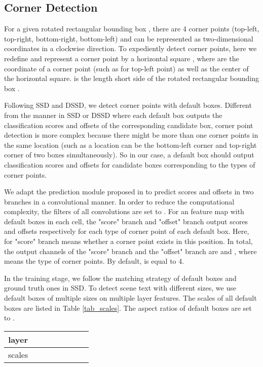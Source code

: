 \documentclass[10pt,twocolumn,letterpaper]{article}
\begin{document}
\subsection{Corner Detection}

For a given rotated rectangular bounding box , there are 4 corner points (top-left, top-right, bottom-right, bottom-left) and can be represented as two-dimensional coordinates  in a clockwise direction. To expediently detect corner points, here we redefine and represent a corner point by a horizontal square , where  are the coordinate of a corner point (such as  for top-left point) as well as  the center of the horizontal square.  is the length short side of the rotated rectangular bounding box . 

Following SSD and DSSD, we detect corner points with default boxes. Different from the manner in SSD or DSSD where each default box outputs the classification scores and offsets of the corresponding candidate box, corner point detection is more complex because there might be more than one corner points in the same location (such as a location can be the bottom-left corner and top-right corner of two boxes simultaneously). So in our case, a default box should output classification scores and offsets for  candidate boxes corresponding to the  types of corner points. 

We adapt the prediction module proposed in \cite{fu2017dssd} to predict scores and offsets in two branches in a convolutional manner. In order to reduce the computational complexity, the filters of all convolutions are set to . For an  feature map with  default boxes in each cell, the "score" branch and "offset" branch output  scores and  offsets respectively  for each type of corner point of each default box. Here,  for "score" branch means whether a corner point exists in this position. In total, the output channels of the "score" branch and the "offset" branch  are  and , where  means the type of corner points. By default,  is equal to 4. 

In the training stage, we follow the matching strategy of default boxes and ground truth ones in SSD. To detect scene text with different sizes, we use default boxes of multiple sizes on multiple layer features. The scales of all default boxes are listed in Table \ref{tab_scales}. The aspect ratios of default boxes are set to . 

\begin{table*}
\vspace{-2mm}

\centering{}\begin{tabular}{|c|c|c|c|c|c|c|c|}
\hline 
{\small{}layer} & {\small{}} & {\small{}} & {\small{}} & {\small{}} & {\small{}} & {\small{}} & {\small{}}\tabularnewline
\hline 
\hline 
{\small{}scales} & {\small{}} & {\small{}} & {\small{}} & {\small{}} & {\small{}} & {\small{}} & {\small{}}\tabularnewline
\hline 
\end{tabular}
\caption{Scales of default boxes on different layers.}
\label{tab_scales}
\end{table*}
\end{document}
